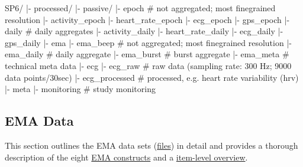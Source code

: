 \documentclass[
  letterpaper,
  DIV=11,
  numbers=noendperiod]{scrartcl}
\newenvironment{Shaded}{\begin{snugshade}}{\end{snugshade}}
\newcommand{\CommentTok}[1]{\textcolor[rgb]{0.37,0.37,0.37}{#1}}
\newcommand{\NormalTok}[1]{\textcolor[rgb]{0.00,0.23,0.31}{#1}}
\newcommand{\OperatorTok}[1]{\textcolor[rgb]{0.37,0.37,0.37}{#1}}
\begin{document}
\begin{Shaded}
\begin{Highlighting}[]
\NormalTok{SP6}\OperatorTok{/}
    \OperatorTok{|{-}}\NormalTok{ processed}\OperatorTok{/}
        \OperatorTok{|{-}}\NormalTok{ passive}\OperatorTok{/}
            \OperatorTok{|{-}}\NormalTok{ epoch                        }\CommentTok{\# not aggregated; most finegrained resolution}
                \OperatorTok{|{-}}\NormalTok{ activity\_epoch}
                \OperatorTok{|{-}}\NormalTok{ heart\_rate\_epoch}
                \OperatorTok{|{-}}\NormalTok{ ecg\_epoch}
                \OperatorTok{|{-}}\NormalTok{ gps\_epoch}
            \OperatorTok{|{-}}\NormalTok{ daily                        }\CommentTok{\# daily aggregates}
                \OperatorTok{|{-}}\NormalTok{ activity\_daily}
                \OperatorTok{|{-}}\NormalTok{ heart\_rate\_daily}
                \OperatorTok{|{-}}\NormalTok{ ecg\_daily}
                \OperatorTok{|{-}}\NormalTok{ gps\_daily}
        \OperatorTok{|{-}}\NormalTok{ ema}
                \OperatorTok{|{-}}\NormalTok{ ema\_beep                 }\CommentTok{\# not aggregated; most finegrained resolution   }
                \OperatorTok{|{-}}\NormalTok{ ema\_daily                }\CommentTok{\# daily aggregate}
                \OperatorTok{|{-}}\NormalTok{ ema\_burst                }\CommentTok{\# burst aggregate}
                \OperatorTok{|{-}}\NormalTok{ ema\_meta                 }\CommentTok{\# technical meta data}
        \OperatorTok{|{-}}\NormalTok{ ecg}
                \OperatorTok{|{-}}\NormalTok{ ecg\_raw                  }\CommentTok{\# raw data (sampling rate: 300 Hz; 9000 data points/30sec)}
                \OperatorTok{|{-}}\NormalTok{ ecg\_processed            }\CommentTok{\# processed, e.g. heart rate variability (hrv) }
        \OperatorTok{|{-}}\NormalTok{ meta}
                \OperatorTok{|{-}}\NormalTok{ monitoring               }\CommentTok{\# study monitoring}
\end{Highlighting}
\end{Shaded}

\subsection{EMA Data}\label{ema-data}

This section outlines the EMA data sets (\hyperref[files]{files}) in
detail and provides a thorough description of the eight
\hyperref[emaconstructs]{EMA constructs} and a
\hyperref[emaconstructs]{item-level overview}.
\end{document}
